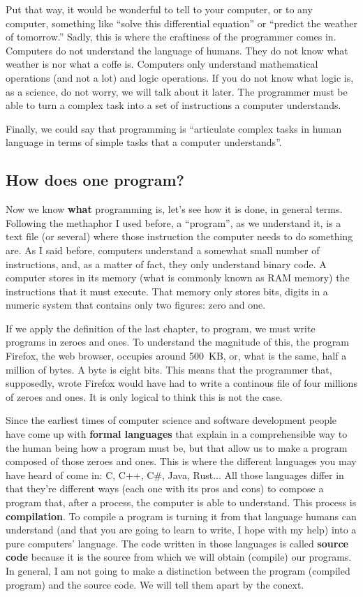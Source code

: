 \documentclass[a4paper]{article}
\begin{document}
Put that way, it would be wonderful to tell to your computer, or to any
computer, something like ``solve this differential equation'' or ``predict the
weather of tomorrow.'' Sadly, this is where the craftiness of the programmer
comes in. Computers do not understand the language of humans. They do not know
what weather is nor what a coffe is. Computers only understand mathematical
operations (and not a lot) and logic operations. If you do not know what logic
is, as a science, do not worry, we will talk about it later.
The programmer must be able to turn a complex
task into a set of instructions a computer understands.

Finally, we could say that programming is ``articulate complex tasks in human
language in terms of simple tasks that a computer understands''.

\subsection{How does one program?}
Now we know \textbf{what} programming is, let's see how it is done, in
general terms. Following the methaphor I used before, a ``program'', as we
understand it, is a text file (or several) where those instruction the computer
needs to do something are. As I said before, computers understand a somewhat
small number of instructions, and, as a matter of fact, they only understand
binary code. A computer stores in its memory (what is commonly known
as RAM memory) the instructions that it must execute. That memory only stores
bits, digits in a numeric system that contains only two figures: zero and one.

If we apply the definition of the last chapter, to program, we must write
programs in zeroes and ones. To understand the magnitude of this, the program
Firefox, the web browser, occupies around 500~KB, or, what is the same, half a
million of bytes. A byte is eight bits. This means that the programmer that,
supposedly, wrote Firefox would have had to write a continous file of four
millions of zeroes and ones. It is only logical to think this is not the case.

Since the earliest times of computer science and software development
people have come up with \textbf{formal languages} that explain in a
comprehensible way to the human being how a program must be, but that allow us
to make a program composed of those zeroes and ones. This is where the different
languages you may have heard of come in: C, C++, C\#, Java, Rust...
All those languages differ in that they're different ways (each one with its
pros and cons) to compose a program that, after a process, the computer is able
to understand. This process is \textbf{compilation}. To compile a program is
turning it from that language humans can understand (and that you are going to
learn to write, I hope with my help) into a pure computers' language. The code
written in those languages is called \textbf{source code} because it is the
source from which we will obtain (compile) our programs. In general, I am not
going to make a distinction between the program (compiled program) and the
source code. We will tell them apart by the conext.
\end{document}
